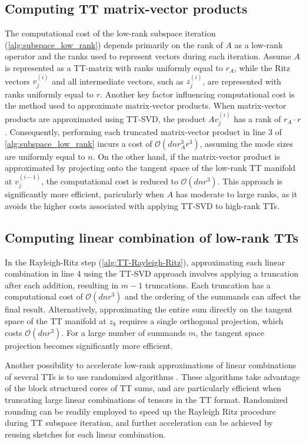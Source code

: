 \documentclass[10pt,preprint]{elsarticle}
\begin{document}
\subsection{Computing TT matrix-vector products}
\label{sec:cost_subspace} 
The computational cost of the low-rank subspace iteration (\cref{alg:subspace_low_rank}) depends primarily on the rank of $A$ as a low-rank operator and the ranks used to represent vectors during each iteration. Assume $A$ is represented as a TT-matrix with ranks uniformly equal to $r_A$, while the Ritz vectors $v_j^{(i)}$ and all intermediate vectors, such as $z_j^{(i)}$, are represented with ranks uniformly equal to $r$. 
%
Another key factor influencing computational cost is the method used to approximate matrix-vector products. When matrix-vector products are approximated using TT-SVD, the product $Av_j^{(i)}$ has a rank of $r_A \cdot r$. Consequently, performing each truncated matrix-vector product in line 3 of \cref{alg:subspace_low_rank} incurs a cost of $\mathcal{O}(dnr_A^3r^3)$, assuming the mode sizes are uniformly equal to $n$. On the other hand, if the matrix-vector product is approximated by projecting onto the tangent space of the low-rank TT manifold at $v_j^{(i-1)}$, the computational cost is reduced to $\mathcal{O}(dnr^3)$. This approach is significantly more efficient, paricularly when $A$ has moderate to large ranks, as it avoids the higher costs associated with applying TT-SVD to high-rank TTs.


\subsection{Computing linear combination of low-rank TTs} 
\label{sec:randtruncation}
In the Rayleigh-Ritz step (\cref{alg:TT-Rayleigh-Ritz}), approximating each linear combination in line 4 using the TT-SVD approach involves applying a truncation after each addition, resulting in $m-1$ truncations. Each truncation has a computational cost of $\mathcal{O}(dnr^3)$ and the ordering of the summands can affect the final result. Alternatively, approximating the entire sum directly on the tangent space of the TT manifold at $z_k$ requires a single orthogonal projection, which costs $\mathcal{O}(dnr^3)$. For a large number of summands $m$, the tangent space projection becomes significantly more efficient. 

Another possibility to accelerate low-rank approximations of linear combinations of several TTs is to use randomized algorithms \cite{Daas2021}. These algorithms take advantage of the block structured cores of TT sums, and are particularly efficient when truncating large linear combinations of tensors in the TT format. Randomized rounding can be readily employed to speed up the Rayleigh Ritz procedure during TT subspace iteration, and further acceleration can be achieved by reusing sketches for each linear combination. 
\end{document}
